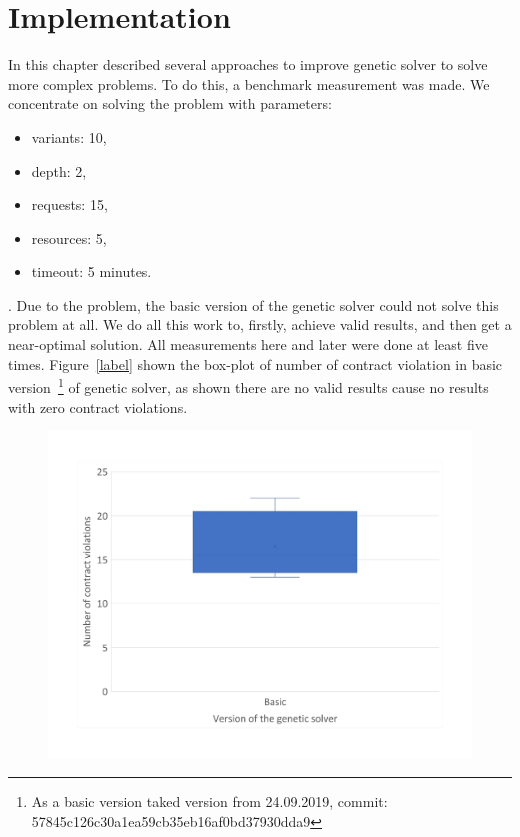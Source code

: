 \chapter{Implementation}\label{chapter:Implementation}
In this chapter described several approaches to improve genetic solver to solve more complex problems.
To do this, a benchmark measurement was made.
We concentrate on solving the problem with parameters:
\begin{itemize}
	\item variants: 10,
	\item depth: 2,
	\item requests: 15,
	\item resources: 5,
	\item timeout: 5 minutes.
\end{itemize}.
Due to the problem, the basic version of the genetic solver could not solve this problem at all. We do all this work to, firstly, achieve valid results, and then get a near-optimal solution. 
All measurements here and later were done at least five times. 
Figure~\ref{label} shown the box-plot of number of contract violation in basic version~\footnote{As a basic version taked version from 24.09.2019, commit: 57845c126c30a1ea59cb35eb16af0bd37930dda9} of genetic solver, as shown there are no valid results cause no results with zero contract violations.

\begin{figure}
	\centering
	\includegraphics[width=\textwidth]{images/BoxPlotSolverBasic}
	\caption[Boxplot with a number of contract violations for the basic version of genetic solver]{}
	\label{fig:boxplotsolverbasic}
\end{figure}


